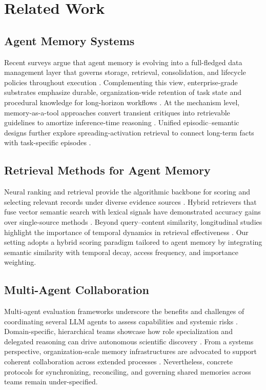 \documentclass{article}
\begin{document}
\section{Related Work}

\subsection{Agent Memory Systems}
Recent surveys argue that agent memory is evolving into a full-fledged data management layer that governs storage, retrieval, consolidation, and lifecycle policies throughout execution \citep{zhou2026we}. Complementing this view, enterprise-grade substrates emphasize durable, organization-wide retention of task state and procedural knowledge for long-horizon workflows \citep{alake2026oracle}. At the mechanism level, memory-as-a-tool approaches convert transient critiques into retrievable guidelines to amortize inference-time reasoning \citep{gallego2026distilling}. Unified episodic–semantic designs further explore spreading-activation retrieval to connect long-term facts with task-specific episodes \citep{jiang2026synapse}.

\subsection{Retrieval Methods for Agent Memory}
Neural ranking and retrieval provide the algorithmic backbone for scoring and selecting relevant records under diverse evidence sources \citep{trabelsi2021neural}. Hybrid retrievers that fuse vector semantic search with lexical signals have demonstrated accuracy gains over single-source methods \citep{sawarkar2024blended,steffens2026vstash}. Beyond query–content similarity, longitudinal studies highlight the importance of temporal dynamics in retrieval effectiveness \citep{ovcharov2026temporal}. Our setting adopts a hybrid scoring paradigm tailored to agent memory by integrating semantic similarity with temporal decay, access frequency, and importance weighting.

\subsection{Multi-Agent Collaboration}
Multi-agent evaluation frameworks underscore the benefits and challenges of coordinating several LLM agents to assess capabilities and systemic risks \citep{rasheed2024large}. Domain-specific, hierarchical teams showcase how role specialization and delegated reasoning can drive autonomous scientific discovery \citep{rothfarb2025hierarchic}. From a systems perspective, organization-scale memory infrastructures are advocated to support coherent collaboration across extended processes \citep{alake2026oracle}. Nevertheless, concrete protocols for synchronizing, reconciling, and governing shared memories across teams remain under-specified.
\end{document}
